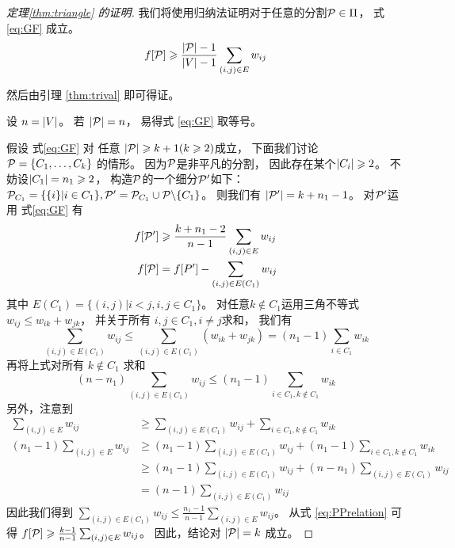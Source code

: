   \begin{proof}[定理\ref{thm:triangle} 的证明]
    我们将使用归纳法证明对于任意的分割$\P \in \Pi$，
    式\eqref{eq:GF} 成立。
    \begin{equation}\label{eq:GF}
    f[\P] \geq \frac{\abs{\P}-1}{\abs{V}-1} \sum_{(i,j) \in E} w_{ij}
    \end{equation}
    
    然后由引理 \ref{thm:trival}
    即可得证。
    
    设 $n=\abs{V}$。
    若 $\abs{\P}=n$，
    易得式 \eqref{eq:GF} 取等号。
    
    假设 式\eqref{eq:GF} 对 任意
    $\abs{\P} \geq k+1(k\geq 2)$成立，
    下面我们讨论 $\P=\{C_1, \dots, C_k\}$
    的情形。
    因为$\P$是非平凡的分割，
    因此存在某个$\abs{C_i}\geq 2$。
    不妨设$\abs{C_1}=n_1\geq 2$，
    构造$\P$的一个细分$\P'$如下：
    $\P_{C_1} = \{\{i\}| i \in C_1\}, \P'=\P_{C_1} \cup \P \backslash \{C_1\}$。
    则我们有 $\abs{\P'} = k+n_1-1$。
    对$\P'$运用 式\eqref{eq:GF} 有
    \begin{align}\label{eq:PPrelation}
    f[\P'] &
    \geq \frac{k+n_1 -2}{n-1}\sum_{(i,j) \in E} w_{ij} \\
    f[\P] & =f[P'] - \sum_{(i,j) \in E(C_1)} w_{ij}
    \end{align}
    其中
    $E(C_1) =\{ (i,j) |i<j, i, j\in C_1 \}$。
    对任意$k \not\in C_1$运用三角不等式
    $w_{ij} \leq w_{ik} + w_{jk}$，
    并关于所有 $i, j \in C_1, i\neq j$求和，
    我们有
    $$
    \sum_{(i,j) \in E(C_1)} w_{ij} \leq \sum_{(i,j) \in E(C_1)} (w_{ik} + w_{jk}) = (n_1-1)\sum_{i\in C_1} w_{ik}
    $$
    再将上式对所有 $k \not\in C_1$ 求和
    $$
    (n - n_1) \sum_{(i,j) \in E(C_1)} w_{ij} \leq (n_1 - 1) \sum_{i \in C_1, k \not\in C_1} w_{ik}
    $$
    另外，注意到
    \begin{align*}
    \sum_{(i,j) \in E} w_{ij}  & \geq \sum_{(i,j) \in E(C_1)} w_{ij} + \sum_{i\in C_1, k\not\in C_1} w_{ik} \\
    (n_1 - 1)\sum_{(i,j) \in E} w_{ij}  & \geq (n_1 -1 )\sum_{(i,j) \in E(C_1)} w_{ij} + (n_1-1)\sum_{i\in C_1, k\not\in C_1} w_{ik} \\
    & \geq (n_1 -1 )\sum_{(i,j) \in E(C_1)} w_{ij} + (n - n_1) \sum_{(i,j) \in E(C_1)} w_{ij}\\
    & = (n-1) \sum_{(i,j) \in E(C_1)} w_{ij}
    \end{align*}
   因此我们得到 $\sum_{(i,j) \in E(C_1)} w_{ij} \leq \frac{n_1-1}{n-1}\sum_{(i,j) \in E} w_{ij}$。
   从式 \eqref{eq:PPrelation} 可得
    $f[\P] \geq \frac{k-1}{n-1}\sum_{(i,j) \in E} w_{ij}$。
    因此，结论对 $\abs{\P}=k$ 成立。
    \end{proof}

